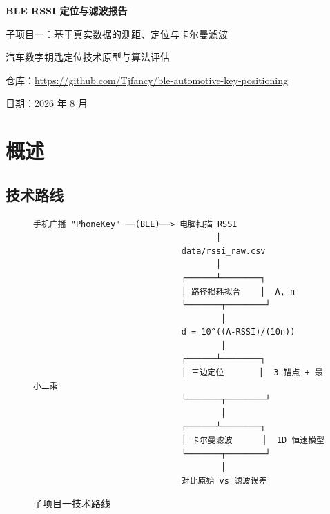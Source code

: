\documentclass[11pt,a4paper]{article}
\begin{document}
\begin{titlepage}
\centering
\vspace*{2cm}
{\Huge\bfseries BLE RSSI 定位与滤波报告\par}
\vspace{0.5cm}
{\Large 子项目一：基于真实数据的测距、定位与卡尔曼滤波\par}
\vspace{1cm}
{\large 汽车数字钥匙定位技术原型与算法评估\par}
\vspace{2cm}
\begin{abstract}
本报告面向汽车数字钥匙场景中的 \textbf{BLE RSSI 定位} 技术。从 RSSI 数据采集出发，拟合对数距离路径损耗模型实现测距，再通过最小二乘三边定位解算二维坐标，最后用 1D 卡尔曼滤波平滑距离序列以提升定位精度。报告覆盖数据采集、模型拟合、定位算法、滤波设计与实验评估全流程。
\end{abstract}
\vspace{2cm}
{\small 仓库：\url{https://github.com/Tjfancy/ble-automotive-key-positioning}\par}
{\small 日期：2026 年 8 月\par}
\end{titlepage}

\tableofcontents
\newpage

\section{概述}

\subsection{技术路线}

\begin{figure}[H]
\centering
\begin{verbatim}
手机广播 "PhoneKey" ──(BLE)──> 电脑扫描 RSSI
                                     │
                              data/rssi_raw.csv
                                     │
                              ┌──────┴────────┐
                              │ 路径损耗拟合    │  A, n
                              └───────┬────────┘
                                      │
                              d = 10^((A-RSSI)/(10n))
                                      │
                              ┌──────┴────────┐
                              │ 三边定位       │  3 锚点 + 最小二乘
                              └───────┬────────┘
                                      │
                              ┌──────┴────────┐
                              │ 卡尔曼滤波      │  1D 恒速模型
                              └───────┬────────┘
                                      │
                              对比原始 vs 滤波误差
\end{verbatim}
\caption{子项目一技术路线}
\end{figure}
\end{document}
